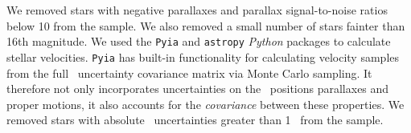 We removed stars with negative parallaxes and parallax signal-to-noise ratios
below 10 from the sample.
We also removed a small number of stars fainter than 16th magnitude.
We used the {\tt Pyia} \citep{price-whelan_2018} and {\tt astropy}
\citep{astropy2013, astropy2018} {\it Python} packages to calculate stellar
velocities.
{\tt Pyia} has built-in functionality for calculating velocity samples from
the full \gaia\ uncertainty covariance matrix via Monte Carlo sampling.
It therefore not only incorporates uncertainties on the \gaia\ positions
parallaxes and proper motions, it also accounts for the {\it covariance}
between these properties.
We removed stars with absolute \vb\ uncertainties greater than 1 \kms\ from
the sample.

